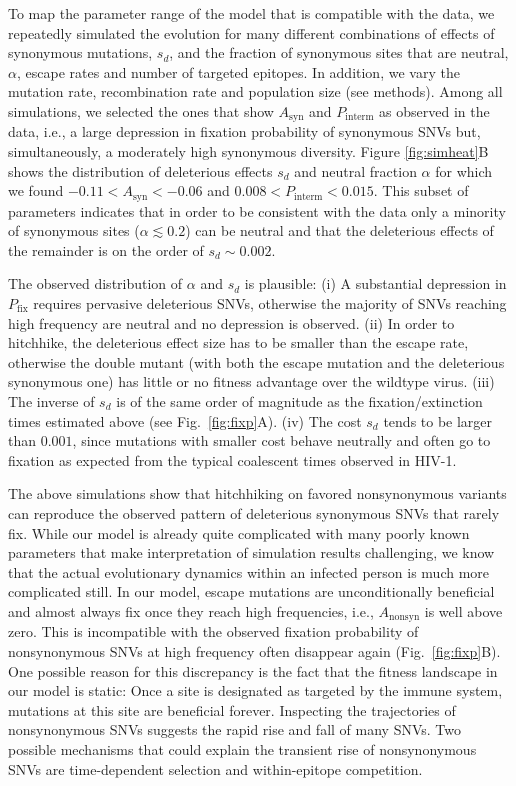 \documentclass[11pt]{article}
\newcommand{\pfix}{P_{\mathrm{fix}}}
\newcommand{\FIG}[1]{Fig.~\ref{fig:#1}}
\begin{document}
To map the parameter range of the model that is compatible with the data, we
repeatedly simulated the evolution for many different combinations of
effects of synonymous mutations, $s_d$, and the fraction of synonymous
sites that are neutral, $\alpha$, escape rates and number of targeted epitopes. In
addition, we vary the mutation rate, recombination rate and population
size (see methods).  Among all simulations, we selected the ones
that show $A_\text{syn}$ and $P_\text{interm}$ as observed in the data, i.e., a
large depression in fixation probability of synonymous SNVs but, simultaneously,
a moderately high synonymous diversity. Figure \ref{fig:simheat}B shows
the distribution of deleterious effects $s_d$ and neutral fraction
$\alpha$ for which we found $-0.11 < A_\text{syn} < -0.06$ and $0.008 <
P_\text{interm} < 0.015$. This subset of parameters indicates that in
order to be consistent with the data only
a minority of synonymous sites ($\alpha \lesssim 0.2$) can be neutral  and that
the deleterious effects of the remainder is on the order of $s_d \sim
0.002$. 

The observed distribution of $\alpha$ and $s_d$ is plausible:
(i) A substantial depression in $\pfix$ requires pervasive deleterious SNVs, otherwise
the majority of SNVs reaching high frequency are neutral and no depression is
observed. (ii) In order to hitchhike, the deleterious effect size has to be 
smaller than the escape rate, otherwise the double mutant (with both the escape
mutation and the deleterious synonymous one) has little or no fitness advantage
over the wildtype virus. (iii) The inverse of $s_d$ is of the same order of magnitude as the
fixation/extinction times estimated above (see \FIG{fixp}A). (iv)
The cost $s_d$ tends to be larger than $0.001$, since mutations with smaller
cost behave neutrally and often go to fixation
as expected from the typical coalescent times observed in HIV-1.


The above simulations show that hitchhiking on favored nonsynonymous
variants can reproduce the observed pattern of deleterious synonymous SNVs that
rarely fix. While our model is already quite complicated with many
poorly known parameters that make interpretation of simulation results
challenging, we know that the actual evolutionary dynamics within an
infected person is much more complicated still. In our model, 
 escape mutations are unconditionally beneficial and almost
always fix once they reach high frequencies, i.e., $A_{\mathrm{nonsyn}}$ is well
above zero. This is incompatible with the observed fixation probability of
nonsynonymous SNVs at high frequency often disappear again
(\FIG{fixp}B). One possible reason for this discrepancy is the fact that
the fitness landscape in our model is static: Once a site is designated
as targeted by the immune system, mutations at this site are beneficial
forever. Inspecting the trajectories of
nonsynonymous SNVs suggests the rapid rise and fall of many SNVs. Two
possible mechanisms that could explain the transient rise of
nonsynonymous SNVs are time-dependent selection and within-epitope competition.
\end{document}
